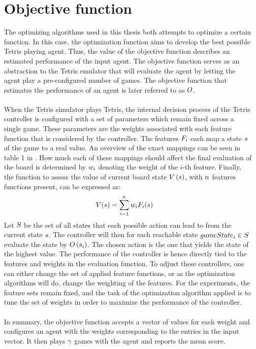 \section{Objective function}

The optimizing algorithms used in this thesis both attempts to 
optimize a certain function. In this case, the optimization 
function aims to develop the best possible Tetris playing agent.
Thus, the value of the objective function describes an estimated 
performance of the input agent. The objective function serves as
an abstraction to the Tetris emulator that will evaluate 
the agent by letting the agent play a pre-configured number 
of games. The objective function that estimates the performance 
of an agent is later referred to as $O$.\\
\\
When the Tetris simulator plays Tetris, the internal decision process
of the Tetris controller is configured with a set of parameters which remain
fixed across a single game. These parameters are the weights associated 
with each feature function that is considered by the controller. 
The features $F _{i}$
each map a state $s$ of the game to a real value. 
An overview of the exact mappings
can be seen in table 1 in \citep{scherrer2009:b}. How much each of these mappings
should affect the final evaluation of the board is determined by $w _{i}$
denoting the weight of the $i$-th feature.
Finally, the function to assess the value 
of current board state $V \left( s \right)$, 
with $n$ features functions present, can be expressed as:
\begin{align*}
V (s ) &= 
\sum_{i=1}^{n} w _{i}F _{i}(s )
\end{align*}
Let $S$ be the set of all states that each possible 
action can lead to from the current state $s$. The 
controller will then for each reachable state 
$gameState_i \in S$ evaluate the state by 
$O \left( s_i \right)$. 
The chosen action is the one that yields the state of the highest value.
The performance of the controller is hence directly tied to the 
features and weights in the evaluation function. To adjust these controllers,
one can either change the set of applied feature functions, or as the 
optimization algorithms will do, change the weighting of the features.
For the experiments, the feature sets remain fixed, and the task of the
optimization algorithm applied is to tune the set of weights in order 
to maximize the performance of the controller.\\
\\
In summary, the objective function accepts a vector of values for each weight
and configures an agent with the weights corresponding to the entries in
the input vector. It then plays $\gamma$ games with the
agent and reports the mean score.

